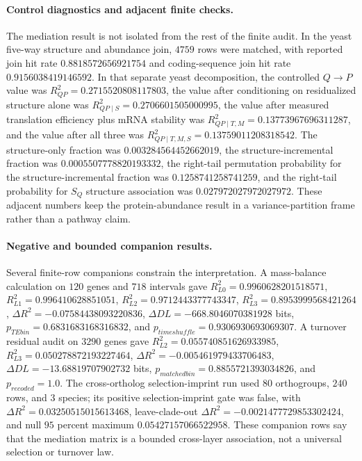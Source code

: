 \paragraph{Control diagnostics and adjacent finite checks.}
The mediation result is not isolated from the rest of the finite audit.  In the yeast five-way structure and abundance join, $4759$ rows were matched, with reported join hit rate $0.8818572656921754$ and coding-sequence join hit rate $0.9156038419146592$.  In that separate yeast decomposition, the controlled $Q \to P$ value was $R^2_{QP}=0.2715520808117803$, the value after conditioning on residualized structure alone was $R^2_{QP\mid S}=0.2706601505000995$, the value after measured translation efficiency plus mRNA stability was $R^2_{QP\mid T,M}=0.13773967696311287$, and the value after all three was $R^2_{QP\mid T,M,S}=0.13759011208318542$.  The structure-only fraction was $0.003284564452662019$, the structure-incremental fraction was $0.0005507778820193332$, the right-tail permutation probability for the structure-incremental fraction was $0.1258741258741259$, and the right-tail probability for $S_Q$ structure association was $0.027972027972027972$.  These adjacent numbers keep the protein-abundance result in a variance-partition frame rather than a pathway claim.

\paragraph{Negative and bounded companion results.}
Several finite-row companions constrain the interpretation.  A mass-balance calculation on $120$ genes and $718$ intervals gave $R^2_{L0}=0.9960628201518571$, $R^2_{L1}=0.996410628851051$, $R^2_{L2}=0.9712443377743347$, $R^2_{L3}=0.8953999568421264$, $\Delta R^2=-0.07584438093220836$, $\Delta DL=-668.8046070381928$ bits, $p_{TEbin}=0.6831683168316832$, and $p_{timeshuffle}=0.9306930693069307$.  A turnover residual audit on $3290$ genes gave $R^2_{L2}=0.055740851626933985$, $R^2_{L3}=0.050278872193227464$, $\Delta R^2=-0.005461979433706483$, $\Delta DL=-13.68819707902732$ bits, $p_{matchedbin}=0.8855721393034826$, and $p_{recoded}=1.0$.  The cross-ortholog selection-imprint run used $80$ orthogroups, $240$ rows, and $3$ species; its positive selection-imprint gate was false, with $\Delta R^2=0.03250515015613468$, leave-clade-out $\Delta R^2=-0.0021477729853302424$, and null $95$ percent maximum $0.05427157066522958$.  These companion rows say that the mediation matrix is a bounded cross-layer association, not a universal selection or turnover law.

